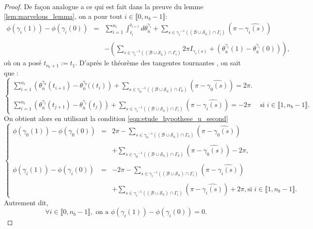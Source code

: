 \begin{proof}
De façon analogue a ce qui est fait dans la preuve du lemme \ref{lem:marvelous_lemma}, on a pour tout $i\in\llbracket 0, n_b-1\rrbracket$:
$$
\begin{array}{lcl}
    \phi(\gamma_i(1))-\phi(\gamma_i(0))&=&\displaystyle\sum_{i=1}^{n_t}\int_{t_i}^{t_{i+1}}d\theta_{\bar{n}}^{\gamma_i}+\sum_{s\in{\gamma_i}^{-1}((\mathcal{B}\cup\mathcal{S}_{\bar{n}})\cap\Gamma_i)}\left(\pi-\widehat{\gamma_i(s)}\right)\\\\
    &&-\displaystyle\left(\sum_{s\in{\gamma_i}^{-1}((\mathcal{B}\cup\mathcal{S}_{\bar{n}})\cap\Gamma_i)}2\pi I_{\gamma_i(s)}+(\theta_{\bar{u}}^{\gamma_i}(1)-\theta_{\bar{u}}^{\gamma_i}(0))\right),
\end{array}
$$
    où on a posé $t_{n_t+1}:=t_1$. D'après le théorème des tangentes tournantes \cite{hopf1935drehung, rotskoff2010gauss}, on sait que :
    $$
    \left\{
    \begin{array}{ll}
    \displaystyle\sum_{i=1}^{n_t}\left(\theta_{\bar{n}}^{\gamma_0}(t_{i+1})-\theta_{\bar{n}}^{\gamma_0}((t_i)\right)+\sum_{s\in{\gamma_0}^{-1}((\mathcal{B}\cup\mathcal{S}_{\bar{n}})\cap\Gamma_0)}\left(\pi-\widehat{\gamma_0(s)}\right)=2\pi.\\\\
    \displaystyle\sum_{i=1}^{n_t}\left(\theta_{\bar{n}}^{\gamma_i}(t_{j+1})-\theta_{\bar{n}}^{\gamma_i}(t_j)\right)+\sum_{s\in{\gamma_i}^{-1}((\mathcal{B}\cup\mathcal{S}_{\bar{n}})\cap\Gamma_i)}\left(\pi-\widehat{\gamma_i(s)}\right)=-2\pi&\mbox{ si }i\in\llbracket1, n_b-1\rrbracket.
    \end{array}
    \right.
    $$
    On obtient alors en utilisant la condition \eqref{eqn:etude_hypothese_u_second}
    $$
    \left\{
    \begin{array}{lcl}
    \phi(\gamma_0(1))-\phi(\gamma_0(0))&=&2\pi-\displaystyle\sum_{s\in{\gamma_0}^{-1}((\mathcal{B}\cup\mathcal{S}_{\bar{n}})\cap\Gamma_0)}\left(\pi-\widehat{\gamma_0(s)}\right)\\\\
    &&+\displaystyle\sum_{s\in{\gamma_0}^{-1}((\mathcal{B}\cup\mathcal{S}_{\bar{n}})\cap\Gamma_0)}\left(\pi-\widehat{\gamma_0(s)}\right)-2\pi,\\\\
    \phi(\gamma_i(1))-\phi(\gamma_i(0))&=&-2\pi-\displaystyle\sum_{s\in{\gamma_i}^{-1}((\mathcal{B}\cup\mathcal{S}_{\bar{n}})\cap\Gamma_i)}\left(\pi-\widehat{\gamma_i(s)}\right)\\\\
    &&+\displaystyle\sum_{s\in{\gamma_i}^{-1}((\mathcal{B}\cup\mathcal{S}_{\bar{n}})\cap\Gamma_i)}\left(\pi-\widehat{\gamma_i(s)}\right)+2\pi, \mbox{si }i\in\llbracket 1, n_b-1\rrbracket.
    \end{array}
    \right.
    $$
    Autrement dit,
    $$
    \forall i\in\llbracket 0, n_b-1\rrbracket,\mbox{ on a }\phi(\gamma_i(1))-\phi(\gamma_i(0))=0.
    $$
\end{proof}
